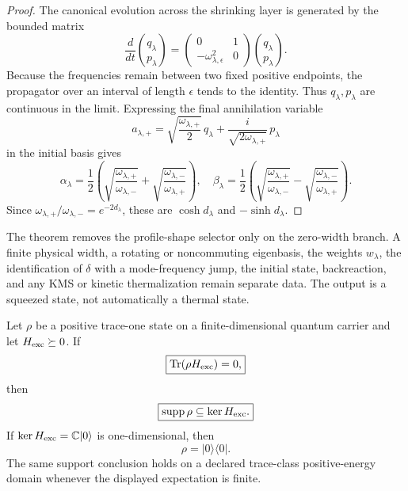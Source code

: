 \documentclass[12pt,a4paper]{article}
\begin{document}
\begin{proof}
The canonical evolution across the shrinking layer is generated by the
bounded matrix
\[
 \frac{d}{dt}\binom{q_\lambda}{p_\lambda}
 =
 \begin{pmatrix}0&1\\-\omega_{\lambda,\epsilon}^2&0\end{pmatrix}
 \binom{q_\lambda}{p_\lambda}.
\]
Because the frequencies remain between two fixed positive endpoints, the
propagator over an interval of length \(\epsilon\) tends to the identity.
Thus \(q_\lambda,p_\lambda\) are continuous in the limit.  Expressing the
final annihilation variable
\[
 a_{\lambda,+}
 =\sqrt{\frac{\omega_{\lambda,+}}2}\,q_\lambda
  +\frac{i}{\sqrt{2\omega_{\lambda,+}}}\,p_\lambda
\]
in the initial basis gives
\[
 \alpha_\lambda
 =\frac12\left(
 \sqrt{\frac{\omega_{\lambda,+}}{\omega_{\lambda,-}}}
 +\sqrt{\frac{\omega_{\lambda,-}}{\omega_{\lambda,+}}}\right),
 \quad
 \beta_\lambda
 =\frac12\left(
 \sqrt{\frac{\omega_{\lambda,+}}{\omega_{\lambda,-}}}
 -\sqrt{\frac{\omega_{\lambda,-}}{\omega_{\lambda,+}}}\right).
\]
Since \(\omega_{\lambda,+}/\omega_{\lambda,-}=e^{-2d_\lambda}\),
these are \(\cosh d_\lambda\) and \(-\sinh d_\lambda\).
\end{proof}

\begin{remark}
\label{p4:rem:thin-layer-squeeze-scope}
The theorem removes the profile-shape selector only on the zero-width branch.
A finite physical width, a rotating or noncommuting eigenbasis, the weights
\(w_\lambda\), the identification of \(\delta\) with a mode-frequency jump,
the initial state, backreaction, and any KMS or kinetic thermalization remain
separate data.  The output is a squeezed state, not automatically a thermal
state.
\end{remark}



\begin{theorem}
\label{p4:thm:v2105-zero-excess-ground-support}
Let \(\rho\) be a positive trace-one state on a finite-dimensional quantum
carrier and let \(H_{\rm exc}\succeq0\).  If
\begin{equation}
\label{p4:eq:v2105-zero-excess-ground-support}
 \boxed{\operatorname{Tr}(\rho H_{\rm exc})=0,}
\end{equation}
then
\begin{equation}
\label{p4:eq:v2105-ground-kernel-support}
 \boxed{\operatorname{supp}\rho\subseteq\ker H_{\rm exc}.}
\end{equation}
If \(\ker H_{\rm exc}=\mathbb C|0\rangle\) is one-dimensional, then
\begin{equation}
\label{p4:eq:v2105-unique-ground-state}
 \boxed{\rho=|0\rangle\langle0|.}
\end{equation}
The same support conclusion holds on a declared trace-class positive-energy
domain whenever the displayed expectation is finite.
\end{theorem}
\end{document}
